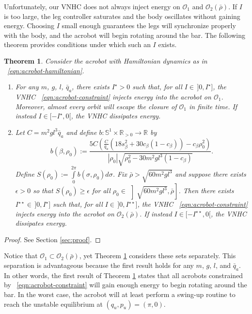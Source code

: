 \documentclass[journal,twoside,web]{ieeecolor}
\newtheorem{thm}{Theorem}%
\newcommand*{\R}{\mathbb{R}}
\newcommand*{\Sone}{\mathbb{S}^1}
\newcommand*{\SxR}{\Sone \times \R}
\begin{document}
Unfortunately, our VNHC does not always inject energy on \(\mathcal{O}_1\) and
\(\mathcal{O}_2(\bar{\rho})\).
If \(I\) is too large, the leg controller saturates and the body oscillates
without gaining energy.
Choosing \(I\) small enough guarantees the legs will synchronize
properly with the body, and the acrobot will begin rotating around the bar.
The following theorem provides conditions under which such an \(I\) exists.

\begin{thm}\label{thm:acrobot-energy-stabilization}
    Consider the acrobot with Hamiltonian dynamics as in ~\eqref{eqn:acrobot-hamiltonian}.
\begin{enumerate}
    \item For any \(m\), \(g\), \(l\), \(\bar{q}_a\), there exists
        \(I^\star > 0\) such that, for all \(I \in \, ]0,I^\star]\), the VNHC
        ~\eqref{eqn:acrobot-constraint} injects energy into the acrobot on
        \(\mathcal{O}_1\).
        Moreover, almost every orbit will escape the closure of
        \(\mathcal{O}_1\) in finite time.
        If instead \(I \in [-I^\star,0[\), the VNHC dissipates energy.
    \item Let \(C = m^2gl^3\bar{q}_a\) and 
        define \(b : \SxR_{> 0} \rightarrow \R\) by
    \[
        b(\beta,\rho_0) := 
        \frac{5C \left(
        \frac{C}{\bar{q}_a}\left(18s_\beta^2 + 30c_\beta(1 - c_\beta)\right)
            - c_\beta\rho_0^2
        \right)}{
        |\rho_0|\sqrt{\rho_0^2 - 30m^2gl^3(1 - c_\beta)}
        }
        .
    \]
        Define 
        \(S(\rho_0) := \int \limits_{0}^{2\pi} b(\sigma,\rho_0)d\sigma\).
        Fix \(\bar{\rho} > \sqrt{60m^2gl^3}\) and
        suppose there exists \(\epsilon > 0\) so that 
        \(S(\rho_0) \geq \epsilon\) for all 
        \(\rho_0 \in \, \left]\sqrt{60m^2gl^3}, \bar{\rho}\right]\).
        Then there exists \(I^{\star\star} \in \, ]0, I^\star]\) such that, for all 
        \(I \in \, ]0,I^{\star\star}]\), the VNHC
        ~\eqref{eqn:acrobot-constraint} injects energy into the acrobot on
        \(\mathcal{O}_2(\bar{\rho})\).
        If instead \(I \in [-I^{\star\star},0[\), the VNHC dissipates energy.
\end{enumerate}
\end{thm}
\begin{proof}
    See Section \ref{sec:proof}.
\end{proof}

Notice that \(\mathcal{O}_1 \subset \mathcal{O}_2(\bar{\rho})\), yet
Theorem \ref{thm:acrobot-energy-stabilization} considers these sets separately.
This separation is advantageous because the first result holds for any
\(m\), \(g\), \(l\), and \(\bar{q}_a\). 
In other words, the first result of Theorem
\ref{thm:acrobot-energy-stabilization} states that all acrobots constrained by
~\eqref{eqn:acrobot-constraint} will gain enough energy to begin rotating around
the bar.
In the worst case, the acrobot will at least perform a swing-up routine to reach
the unstable equilibrium at \((q_u,p_u) = (\pi,0)\).
\end{document}
